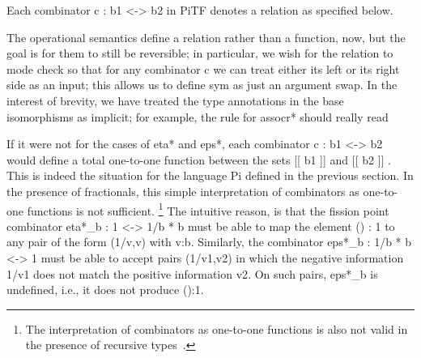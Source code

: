\documentclass{llncs}
\begin{document}
\begin{definition}
\label{def:relational-PiTF}
Each combinator {{c : b1 <-> b2}} in {{PiTF}} denotes a relation
as specified below. 
%
%
%
%
%
%
%
%
%
%
%
%
\end{definition}

The operational semantics define a relation rather than a function, now, but the
goal is for them to still be reversible; in particular, we wish for the relation
to mode check so that for any combinator {{c}} we can treat either its left or
its right side as an input; this allows us to define {{sym}} as just an argument
swap. In the interest of brevity, we have treated the type annotations in the
base isomorphisms as implicit; for example, the rule for {{assocr*}} should
really read


If it were not for the cases of {{eta*}} and {{eps*}}, each combinator 
{{c : b1 <-> b2}} would define a total one-to-one function between the sets 
{{ [[ b1 ]] }} and {{ [[ b2 ]] }}. 
This is indeed the situation for the language {{Pi}} 
defined in the previous section. In the presence of fractionals, this simple 
interpretation of combinators as one-to-one functions is not sufficient.
\footnote{The interpretation of combinators as one-to-one functions is also 
not valid in the presence of recursive 
types~\cite{rc2011,James:2012:IE:2103656.2103667}.}
The intuitive reason, is that the fission point combinator 
{{eta*_b : 1 <-> 1/b * b}} must be
able to map the element {{() : 1}} to any pair of the form {{(1/v,v)}} with
{{v:b}}. Similarly, the combinator {{eps*_b : 1/b * b <-> 1}} must be able to
accept pairs {{(1/v1,v2)}} in which the negative information {{1/v1}} does
not match the positive information {{v2}}. On such pairs, {{eps*_b}} is
undefined, i.e., it does not produce {{():1}}. 
\end{document}
